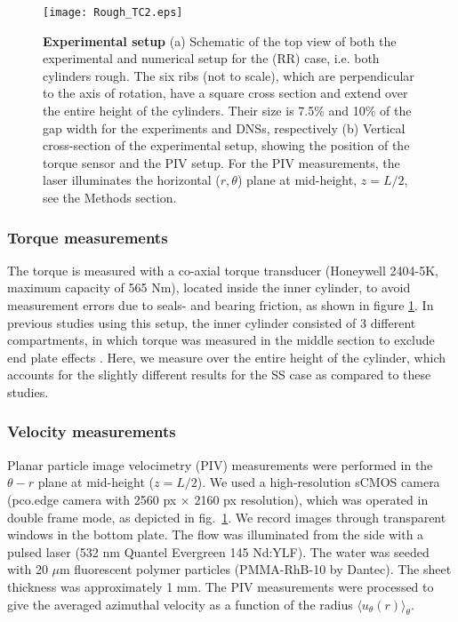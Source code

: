 \documentclass[aps,prl,superscriptaddress,preprint]{revtex4}
\begin{document}
\begin{figure}[htp]
\begin{center}
\texttt{[image: Rough\_TC2.eps]}
\caption{{\bf Experimental setup} (a) Schematic of the top view of both the experimental and numerical setup for the (RR) case, i.e. both cylinders rough. The six ribs (not to scale), which are perpendicular to the axis of rotation, have a square cross section and extend over the entire height of the cylinders. Their size is 7.5\% and 10\% of the gap width for the experiments and DNSs, respectively  (b) Vertical cross-section of the experimental setup, showing the position of the torque sensor and the PIV setup. For the PIV measurements, the laser illuminates the horizontal ($r, \theta$) plane at mid-height, $z = L/2$, see the Methods section.}
\label{fig:setup}
\end{center}
\end{figure}

\subsubsection{Torque measurements}
The torque is measured with a co-axial torque transducer (Honeywell 2404-5K, maximum capacity of 565 Nm), located inside the inner cylinder, to avoid measurement errors due to seals- and bearing friction, as shown in figure \ref{fig:setup}. In previous studies using this setup, the inner cylinder consisted of 3 different compartments, in which torque was measured in the middle section to exclude end plate effects \cite{gil11,gil12,hui14}. Here, we measure over the entire height of the cylinder, which accounts for the slightly different results for the SS case as compared to these studies.

\subsubsection{Velocity measurements}
Planar particle image velocimetry (PIV) measurements were performed in the $\theta-r$ plane at mid-height ($z=L/2$). We used a high-resolution sCMOS camera (pco.edge camera with 2560 px $\times$ 2160 px resolution), which was operated in double frame mode, as depicted in fig.\ \ref{fig:setup}. We record images through transparent windows in the bottom plate. The flow was illuminated from the side with a pulsed laser (532 nm Quantel Evergreen 145 Nd:YLF). The water was seeded with 20 $\mu$m fluorescent polymer particles (PMMA-RhB-10 by Dantec). The sheet thickness was approximately 1 mm. The PIV measurements were processed to give the averaged azimuthal velocity as a function of the radius $\langle u_{\theta}(r) \rangle_{\theta}$.
\end{document}
